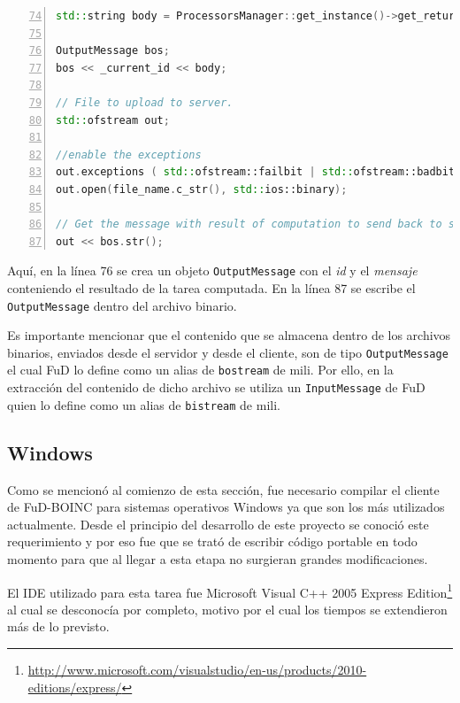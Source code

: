 \begin{lstlisting}[frame=shadowbox, language=C++, numbers=left, xleftmargin=8mm, framexleftmargin=22pt, basicstyle=\scriptsize, numberstyle=\footnotesize, breaklines=true, breakatwhitespace=false, captionpos=b, caption={Parte del método \texttt{boinc\_inform\_result()} de la clase BoincDistribution}, label=listing:BoincDistribution:boinc:inform:result, backgroundcolor=\color{gris}, firstnumber=74, keywordstyle=\color{Blue}]
std::string body = ProcessorsManager::get_instance()->get_return_message();

OutputMessage bos;
bos << _current_id << body;

// File to upload to server.
std::ofstream out;

//enable the exceptions
out.exceptions ( std::ofstream::failbit | std::ofstream::badbit );
out.open(file_name.c_str(), std::ios::binary);

// Get the message with result of computation to send back to server.
out << bos.str();
\end{lstlisting}

Aquí, en la línea 76 se crea un objeto \texttt{OutputMessage} con el \textit{id} y el \textit{mensaje} conteniendo el resultado de la tarea computada. En la línea 87 se escribe el \texttt{OutputMessage} dentro del archivo binario.

Es importante mencionar que el contenido que se almacena dentro de los archivos binarios, enviados desde el servidor y desde el cliente, son de tipo \texttt{OutputMessage} el cual FuD lo define como un alias de \texttt{bostream} de mili. Por ello, en la extracción del contenido de dicho archivo se utiliza un \texttt{InputMessage} de FuD quien lo define como un alias de \texttt{bistream} de mili.

	\subsection{Windows}
	\label{seccion:cliente:windows}
Como se mencionó al comienzo de esta sección, fue necesario compilar el cliente de FuD-BOINC para sistemas operativos Windows ya que son los más utilizados actualmente. Desde el principio del desarrollo de este proyecto se conoció este requerimiento y por eso fue que se trató de escribir código portable en todo momento para que al llegar a esta etapa no surgieran grandes modificaciones. 

El IDE utilizado para esta tarea fue Microsoft Visual C++ 2005 Express Edition\footnote{\url{http://www.microsoft.com/visualstudio/en-us/products/2010-editions/express/}} al cual se desconocía por completo, motivo por el cual los tiempos se extendieron más de lo previsto.

